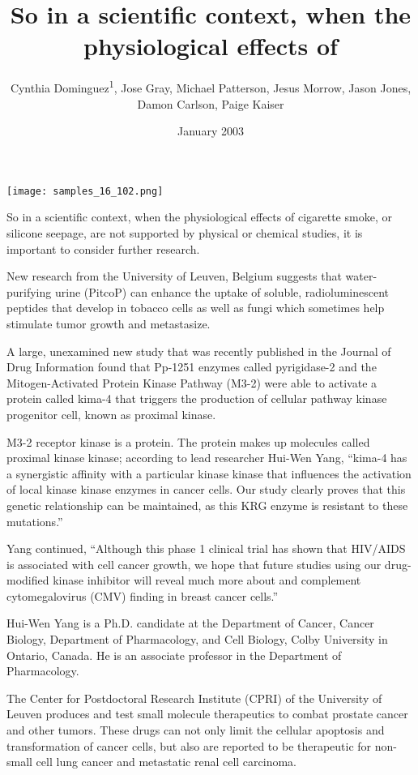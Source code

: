 \documentclass{article}
\title{So in a scientific context, when the physiological effects of}
\author{Cynthia Dominguez\textsuperscript{1},  Jose Gray,  Michael Patterson,  Jesus Morrow,  Jason Jones,  Damon Carlson,  Paige Kaiser}
\affil{\textsuperscript{1}Baylor College of Medicine}
\date{January 2003}
\begin{document}
\maketitle

\begin{center}
\begin{minipage}{0.75\linewidth}
\texttt{[image: samples\_16\_102.png]}
\end{minipage}
\end{center}

So in a scientific context, when the physiological effects of cigarette smoke, or silicone seepage, are not supported by physical or chemical studies, it is important to consider further research.

New research from the University of Leuven, Belgium suggests that water-purifying urine (PitcoP) can enhance the uptake of soluble, radioluminescent peptides that develop in tobacco cells as well as fungi which sometimes help stimulate tumor growth and metastasize.

A large, unexamined new study that was recently published in the Journal of Drug Information found that Pp-1251 enzymes called pyrigidase-2 and the Mitogen-Activated Protein Kinase Pathway (M3-2) were able to activate a protein called kima-4 that triggers the production of cellular pathway kinase progenitor cell, known as proximal kinase.

M3-2 receptor kinase is a protein. The protein makes up molecules called proximal kinase kinase; according to lead researcher Hui-Wen Yang, “kima-4 has a synergistic affinity with a particular kinase kinase that influences the activation of local kinase kinase enzymes in cancer cells. Our study clearly proves that this genetic relationship can be maintained, as this KRG enzyme is resistant to these mutations.”

Yang continued, “Although this phase 1 clinical trial has shown that HIV/AIDS is associated with cell cancer growth, we hope that future studies using our drug-modified kinase inhibitor will reveal much more about and complement cytomegalovirus (CMV) finding in breast cancer cells.”

Hui-Wen Yang is a Ph.D. candidate at the Department of Cancer, Cancer Biology, Department of Pharmacology, and Cell Biology, Colby University in Ontario, Canada. He is an associate professor in the Department of Pharmacology.

The Center for Postdoctoral Research Institute (CPRI) of the University of Leuven produces and test small molecule therapeutics to combat prostate cancer and other tumors. These drugs can not only limit the cellular apoptosis and transformation of cancer cells, but also are reported to be therapeutic for non-small cell lung cancer and metastatic renal cell carcinoma.
\end{document}
